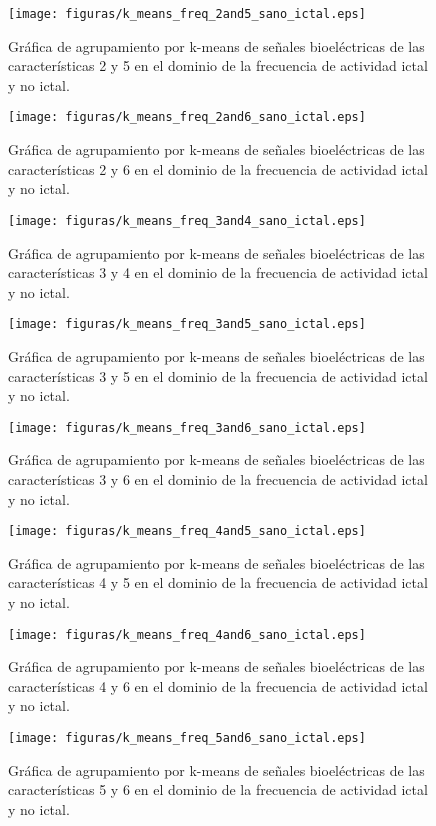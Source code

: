 \begin{figure}[H]
    \centering
    \texttt{[image: figuras/k\_means\_freq\_2and5\_sano\_ictal.eps]}
    \caption{Gráfica de agrupamiento por k-means de señales bioeléctricas de las características 2 y 5 en el dominio de la frecuencia de actividad ictal y no ictal.}
    \label{fig: k_means_freq_2_5}
\end{figure}
\begin{figure}[H]
    \centering
    \texttt{[image: figuras/k\_means\_freq\_2and6\_sano\_ictal.eps]}
    \caption{Gráfica de agrupamiento por k-means de señales bioeléctricas de las características 2 y 6 en el dominio de la frecuencia de actividad ictal y no ictal.}
    \label{fig: k_means_freq_2_6}
\end{figure}
\begin{figure}[H]
    \centering
    \texttt{[image: figuras/k\_means\_freq\_3and4\_sano\_ictal.eps]}
    \caption{Gráfica de agrupamiento por k-means de señales bioeléctricas de las características 3 y 4 en el dominio de la frecuencia de actividad ictal y no ictal.}
    \label{fig: k_means_freq_3_4}
\end{figure}
\begin{figure}[H]
    \centering
    \texttt{[image: figuras/k\_means\_freq\_3and5\_sano\_ictal.eps]}
    \caption{Gráfica de agrupamiento por k-means de señales bioeléctricas de las características 3 y 5 en el dominio de la frecuencia de actividad ictal y no ictal.}
    \label{fig: k_means_freq_3_5}
\end{figure}
\begin{figure}[H]
    \centering
    \texttt{[image: figuras/k\_means\_freq\_3and6\_sano\_ictal.eps]}
    \caption{Gráfica de agrupamiento por k-means de señales bioeléctricas de las características 3 y 6 en el dominio de la frecuencia de actividad ictal y no ictal.}
    \label{fig: k_means_freq_3_6}
\end{figure}
\begin{figure}[H]
    \centering
    \texttt{[image: figuras/k\_means\_freq\_4and5\_sano\_ictal.eps]}
    \caption{Gráfica de agrupamiento por k-means de señales bioeléctricas de las características 4 y 5 en el dominio de la frecuencia de actividad ictal y no ictal.}
    \label{fig: k_means_freq_4_5}
\end{figure}
\begin{figure}[H]
    \centering
    \texttt{[image: figuras/k\_means\_freq\_4and6\_sano\_ictal.eps]}
    \caption{Gráfica de agrupamiento por k-means de señales bioeléctricas de las características 4 y 6 en el dominio de la frecuencia de actividad ictal y no ictal.}
    \label{fig: k_means_freq_4_6}
\end{figure}
\begin{figure}[H]
    \centering
    \texttt{[image: figuras/k\_means\_freq\_5and6\_sano\_ictal.eps]}
    \caption{Gráfica de agrupamiento por k-means de señales bioeléctricas de las características 5 y 6 en el dominio de la frecuencia de actividad ictal y no ictal.}
    \label{fig: k_means_freq_5_6}
\end{figure}



